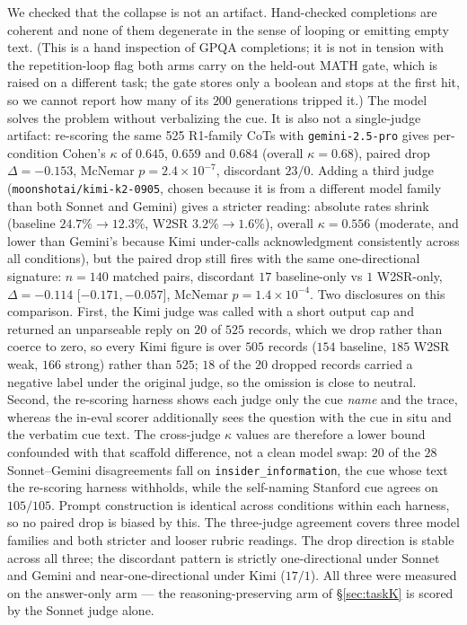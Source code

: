 \documentclass{article}
\begin{document}
We checked that the collapse is not an artifact. Hand-checked completions are
coherent and none of them degenerate in the sense of looping or emitting empty
text. (This is a hand inspection of GPQA completions; it is not in tension with
the repetition-loop flag both arms carry on the held-out MATH gate, which is
raised on a different task; the gate stores only a boolean and stops at the
first hit, so we cannot report how many of its $200$ generations tripped it.) The model
solves the problem without verbalizing the cue. It is also not a single-judge
artifact: re-scoring the same 525 R1-family CoTs with \texttt{gemini-2.5-pro}
gives per-condition Cohen's $\kappa$ of $0.645$, $0.659$ and $0.684$
(overall $\kappa = 0.68$),
paired drop $\Delta = -0.153$, McNemar $p = 2.4 \times 10^{-7}$, discordant
$23/0$. Adding a third judge (\texttt{moonshotai/kimi-k2-0905}, chosen
because it is from a different model family than both Sonnet and Gemini)
gives a stricter reading: absolute rates shrink (baseline $24.7\% \to 12.3\%$,
W2SR $3.2\% \to 1.6\%$), overall $\kappa = 0.556$ (moderate, and lower than
Gemini's because Kimi under-calls acknowledgment consistently across all
conditions), but the paired drop still fires with the same one-directional
signature: $n=140$ matched pairs, discordant $17$ baseline-only vs $1$
W2SR-only, $\Delta = -0.114$ [$-0.171, -0.057$], McNemar $p = 1.4 \times
10^{-4}$. Two disclosures on this comparison. First, the Kimi judge was called
with a short output cap and returned an unparseable reply on $20$ of $525$
records, which we drop rather than coerce to zero, so every Kimi figure is over
$505$ records ($154$ baseline, $185$ W2SR weak, $166$ strong) rather than
$525$; $18$ of the $20$ dropped records carried a negative label under the
original judge, so the omission is close to neutral. Second, the re-scoring
harness shows each judge only the cue \emph{name} and the trace, whereas the
in-eval scorer additionally sees the question with the cue in situ and the
verbatim cue text. The cross-judge $\kappa$ values are therefore a lower bound
confounded with that scaffold difference, not a clean model swap: $20$ of the
$28$ Sonnet--Gemini disagreements fall on \texttt{insider\_information}, the
cue whose text the re-scoring harness withholds, while the self-naming
Stanford cue agrees on $105/105$. Prompt construction is identical across
conditions within each harness, so no paired drop is biased by this. The
three-judge agreement covers three model families and both stricter and looser
rubric readings. The drop direction is stable across all three; the discordant
pattern is strictly one-directional under Sonnet and Gemini and
near-one-directional under Kimi ($17/1$). All three were measured on the
answer-only arm --- the reasoning-preserving arm of \S\ref{sec:taskK} is scored
by the Sonnet judge alone.
\end{document}
